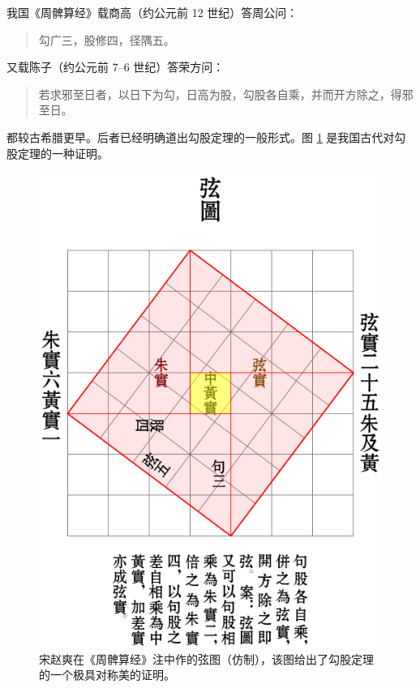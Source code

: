 \documentclass[UTF8]{ctexart}
\newenvironment{myquote}
   {\begin{quote}\kaishu\zihao{-5}}
   {\end{quote}}
\begin{document}
我国《周髀算经》载商高（约公元前 12 世纪）答周公问：
\begin{myquote}
勾广三，股修四，径隅五。
\end{myquote}
又载陈子（约公元前 7--6 世纪）答荣方问：
\begin{quote}
\kaishu 若求邪至日者，以日下为勾，日高为股，勾股各自乘，并而开方除之，得邪至日。
\end{quote}
都较古希腊更早。后者已经明确道出勾股定理的一般形式。图 \ref{fig:xiantu} 是我国古代对勾股定理的一种证明\cite{quanjing}。
\begin{figure}
   \centering
   \includegraphics[scale=0.6]{res/xiantu.pdf}
   \caption{宋赵爽在《周髀算经》注中作的弦图（仿制），该图给出了勾股定理的一个极具对称美的证明。}
   \label{fig:xiantu}
\end{figure}
\end{document}
